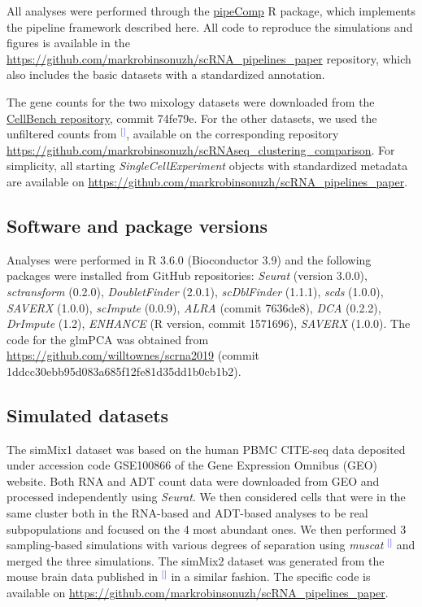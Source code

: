 \documentclass[11pt]{article}
\renewcommand{\cite}[1]{\textcolor{Blue}{$^[$\supercite{#1}$^]$}}
\begin{document}
All analyses were performed through the \href{https://github.com/plger/pipeComp}{pipeComp} R package, which implements the pipeline framework described here. All code to reproduce the simulations and figures is available in the \url{https://github.com/markrobinsonuzh/scRNA\_pipelines\_paper} repository, which also includes the basic datasets with a standardized annotation.

The gene counts for the two mixology datasets were downloaded from the  \href{https://github.com/LuyiTian/CellBench_data/data/sincell_with_class.RData}{CellBench repository}, commit 74fe79e. For the other datasets, we used the unfiltered counts from \cite{duoClustering2018}, available on the corresponding repository \url{https://github.com/markrobinsonuzh/scRNAseq\_clustering\_comparison}. For simplicity, all starting \textit{SingleCellExperiment} objects with standardized metadata are available on \url{https://github.com/markrobinsonuzh/scRNA\_pipelines\_paper}.

\subsection*{Software and package versions}
Analyses were performed in R 3.6.0 (Bioconductor 3.9) and the following packages were installed from GitHub repositories: \textit{Seurat} (version 3.0.0), \textit{sctransform} (0.2.0), \textit{DoubletFinder} (2.0.1), \textit{scDblFinder} (1.1.1), \textit{scds} (1.0.0), \textit{SAVERX} (1.0.0), \textit{scImpute} (0.0.9), \textit{ALRA} (commit 7636de8), \textit{DCA} (0.2.2), \textit{DrImpute} (1.2), \textit{ENHANCE} (R version, commit 1571696), \textit{SAVERX} (1.0.0). The code for the glmPCA was obtained from \url{https://github.com/willtownes/scrna2019} (commit 1ddcc30ebb95d083a685f12fe81d35dd1b0cb1b2).

\subsection*{Simulated datasets}
The simMix1 dataset was based on the human PBMC CITE-seq data deposited under accession code GSE100866 of the Gene Expression Omnibus (GEO) website. Both RNA and ADT count data were downloaded from GEO and processed independently using \textit{Seurat}. We then considered cells that were in the same cluster both in the RNA-based and ADT-based analyses to be real subpopulations and focused on the 4 most abundant ones. We then performed 3 sampling-based simulations with various degrees of separation using \textit{muscat} \cite{CrowellMuscat2019} and merged the three simulations. The simMix2 dataset was generated from the mouse brain data published in \cite{CrowellMuscat2019} in a similar fashion. The specific code is available on \url{https://github.com/markrobinsonuzh/scRNA\_pipelines\_paper}.
\end{document}
